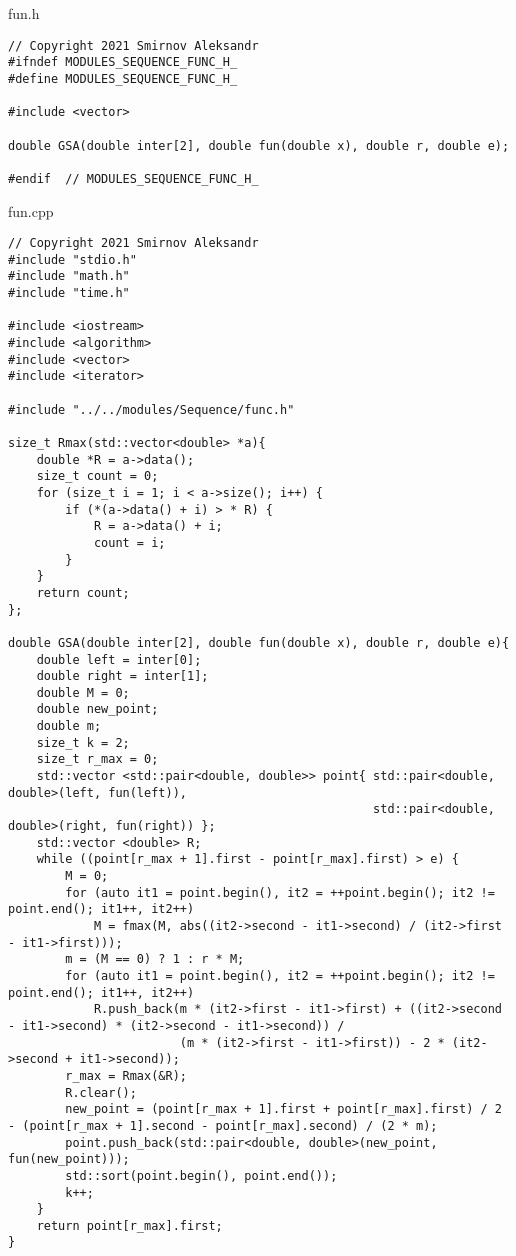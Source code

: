 \documentclass{report}
\begin{document}
fun.h
\begin{lstlisting}
// Copyright 2021 Smirnov Aleksandr
#ifndef MODULES_SEQUENCE_FUNC_H_
#define MODULES_SEQUENCE_FUNC_H_

#include <vector>

double GSA(double inter[2], double fun(double x), double r, double e);

#endif  // MODULES_SEQUENCE_FUNC_H_
\end{lstlisting}

fun.cpp
\begin{lstlisting}
// Copyright 2021 Smirnov Aleksandr
#include "stdio.h"
#include "math.h"
#include "time.h"

#include <iostream>
#include <algorithm>
#include <vector>
#include <iterator>

#include "../../modules/Sequence/func.h"

size_t Rmax(std::vector<double> *a){
    double *R = a->data();
    size_t count = 0;
    for (size_t i = 1; i < a->size(); i++) {
        if (*(a->data() + i) > * R) {
            R = a->data() + i;
            count = i;
        }
    }
    return count;
};

double GSA(double inter[2], double fun(double x), double r, double e){
    double left = inter[0];
    double right = inter[1];
    double M = 0;
    double new_point;
    double m; 
    size_t k = 2;
    size_t r_max = 0;
    std::vector <std::pair<double, double>> point{ std::pair<double, double>(left, fun(left)), 
                                                   std::pair<double, double>(right, fun(right)) };
    std::vector <double> R;
    while ((point[r_max + 1].first - point[r_max].first) > e) {
        M = 0;
        for (auto it1 = point.begin(), it2 = ++point.begin(); it2 != point.end(); it1++, it2++)
            M = fmax(M, abs((it2->second - it1->second) / (it2->first - it1->first)));
        m = (M == 0) ? 1 : r * M;
        for (auto it1 = point.begin(), it2 = ++point.begin(); it2 != point.end(); it1++, it2++)
            R.push_back(m * (it2->first - it1->first) + ((it2->second - it1->second) * (it2->second - it1->second)) / 
                        (m * (it2->first - it1->first)) - 2 * (it2->second + it1->second));
        r_max = Rmax(&R);
        R.clear();
        new_point = (point[r_max + 1].first + point[r_max].first) / 2 - (point[r_max + 1].second - point[r_max].second) / (2 * m);
        point.push_back(std::pair<double, double>(new_point, fun(new_point)));
        std::sort(point.begin(), point.end());
        k++;
    }
    return point[r_max].first;
}
\end{lstlisting}
\end{document}
